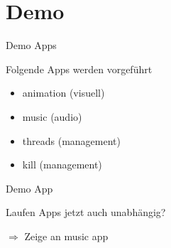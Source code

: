 \section{Demo}

\begin{frame}{Demo Apps}
    \begin{Large}
        Folgende Apps werden vorgeführt
    \end{Large}
    \vspace{15pt}

    \begin{itemize}
        \item animation (visuell)
        \item music (audio)
        \item threads (management)
        \item kill (management)
    \end{itemize}
    
\end{frame}


\begin{frame}{Demo App}
    \begin{Large}
        Laufen Apps jetzt auch unabhängig?
    \end{Large}
    \vspace{15pt} 
    
    $\Rightarrow$ Zeige an music app
\end{frame}

